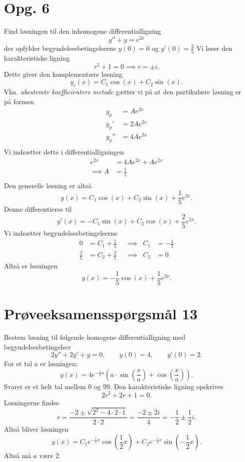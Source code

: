 \documentclass[12pt]{article}
\theoremstyle{definition}
\begin{document}
\section*{Opg. 6}
Find løsningen til den inhomogene differentialligning
\[
y'' + y = e^{2x} 
\]
der opfylder begyndelsesbetingelserne $y(0) = 0$ og $y'(0) = \frac{2}{5}$
\bigbreak
Vi løser den karakteristiske ligning
\[
r^2 + 1 = 0 \implies r = \pm i
.\]
Dette giver den komplementære løsning
\[
y_c(x) = C_1 \cos \left( x \right) + C_2 \sin \left( x \right) 
.\]
Vha. \textit{ubestemte koefficienters metode} gætter vi på at den partikulære løsning er på formen 
\begin{align*}
  y_p &= Ae^{2x} \\
  y_p' &= 2Ae^{2x}  \\
  y_p'' &= 4Ae^{2x}  \\
\end{align*}
Vi indsætter dette i differentialligningen
\begin{align*}
  e^{2x} &= 4Ae^{2x} + Ae^{2x}  \\
  \implies A &= \frac{1}{5} \\
\end{align*}
Den generelle løsning er altså
\[
y(x) = C_1 \cos \left( x \right) + C_2 \sin \left( x \right) + \frac{1}{5}e^{2x} 
.\]
Denne differentieres til
\[
y'(x) = -C_1 \sin \left( x \right) + C_2 \cos \left( x \right) + \frac{2}{5}e^{2x} 
.\]
Vi indsætter begyndelsesbetingelserne
\begin{align*}
  0 &= C_1 + \frac{1}{5} & &\implies & C_1 &= -\frac{1}{5} \\
  \frac{2}{5} &= C_2 + \frac{2}{5} & &\implies & C_2 &= 0
\end{align*}
Altså er løsningen
\[
y(x) = -\frac{1}{5}\cos \left( x \right) + \frac{1}{5}e^{2x} 
.\]


\section*{Prøveeksamensspørgsmål 13}
Bestem løsning til følgende homogene differentialligning med begyndelsesbetingelser
\[
2y'' + 2y' + y = 0, \qquad y(0) = 4, \qquad y'(0) = 2
.\]
For et tal $a$ er løsningen:
\[
y(x) = 4e^{-\frac{1}{2}x} \left( a \cdot \sin \left( \frac{x}{a} \right) + \cos \left( \frac{x}{a} \right)  \right) 
.\]
Svaret er et helt tal mellem \num{0} og \num{99}.
\bigbreak
Den karakteristiske ligning opskrives
\[
2r^2 + 2r + 1 = 0
.\]
Løsningerne findes
\[
r = \frac{-2 \pm \sqrt{2^2 - 4\cdot 2\cdot 1}}{2\cdot 2} = \frac{-2 \pm 2i}{4} = -\frac{1}{2}\pm \frac{1}{2}i  
.\]
Altså bliver løsningen
\[
y(x) = C_1e^{-\frac{1}{2}x} \cos \left( \frac{1}{2}x \right) + C_2e^{-\frac{1}{2}x} \sin \left( -\frac{1}{2}x \right) 
.\]
Altså må $a$ være $2$.
\end{document}
